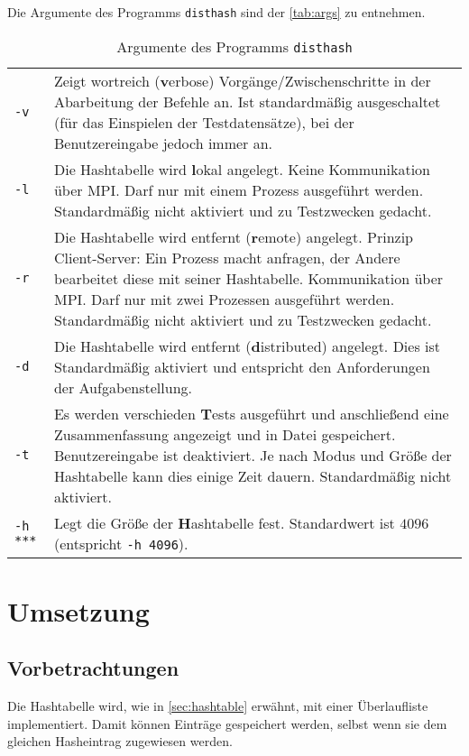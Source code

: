 \documentclass{scrreprt}
\begin{document}
Die Argumente des Programms \lstinline`disthash` sind der \autoref{tab:args} zu entnehmen.
\begin{table}[!ht]
\centering
\begin{tabular}{L{0.1} L{0.8}}
\lstinline`-v` & Zeigt wortreich (\textbf{v}erbose) Vorgänge/Zwischenschritte in der Abarbeitung der Befehle an. Ist standardmäßig ausgeschaltet (für das Einspielen der Testdatensätze), bei der Benutzereingabe jedoch immer an.\\
\lstinline`-l` & Die Hashtabelle wird \textbf{l}okal angelegt. Keine Kommunikation über MPI. Darf nur mit einem Prozess ausgeführt werden. Standardmäßig nicht aktiviert und zu Testzwecken gedacht.\\
\lstinline`-r` & Die Hashtabelle wird entfernt (\textbf{r}emote) angelegt. Prinzip Client-Server: Ein Prozess macht anfragen, der Andere bearbeitet diese mit seiner Hashtabelle. Kommunikation über MPI. Darf nur mit zwei Prozessen ausgeführt werden. Standardmäßig nicht aktiviert und zu Testzwecken gedacht.\\
\lstinline`-d` & Die Hashtabelle wird entfernt (\textbf{d}istributed) angelegt. Dies ist Standardmäßig aktiviert und entspricht den Anforderungen der Aufgabenstellung.\\
\lstinline`-t` & Es werden verschieden \textbf{T}ests ausgeführt und anschließend eine Zusammenfassung angezeigt und in Datei gespeichert. Benutzereingabe ist deaktiviert. Je nach Modus und Größe der Hashtabelle kann dies einige Zeit dauern. Standardmäßig nicht aktiviert.\\
\lstinline`-h ***` & Legt die Größe der \textbf{H}ashtabelle fest. Standardwert ist $4096$ (entspricht \lstinline`-h 4096`).\\
\end{tabular}
\caption{Argumente des Programms \lstinline`disthash`}
\label{tab:args}
\end{table}

\chapter{Umsetzung}

\section{Vorbetrachtungen}

Die Hashtabelle wird, wie in \autoref{sec:hashtable} erwähnt, mit einer Überlaufliste implementiert. Damit können Einträge gespeichert werden, selbst wenn sie dem gleichen Hasheintrag zugewiesen werden.
\end{document}
